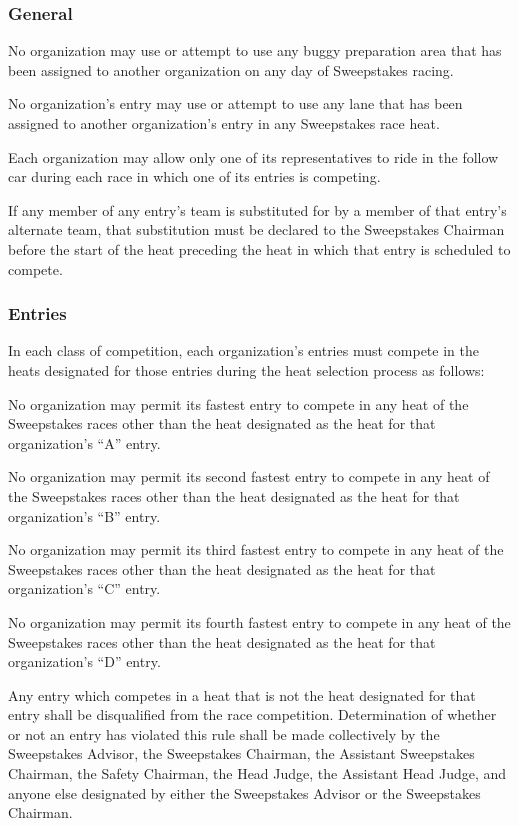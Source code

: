 \subsubsection{General}

No organization may use or attempt to use any buggy preparation area that has been assigned to another organization on any day of Sweepstakes racing.

No organization's entry may use or attempt to use any lane that has been assigned to another organization's entry in any Sweepstakes race heat.

Each organization may allow only one of its representatives to ride in the follow car during each race in which one of its entries is competing.

If any member of any entry's team is substituted for by a member of that entry's alternate team, that substitution must be declared to the Sweepstakes Chairman before the start of the heat preceding the heat in which that entry is scheduled to compete.

\subsubsection{Entries}

In each class of competition, each organization's entries must compete in the heats designated for those entries during the heat selection process as follows:

No organization may permit its fastest entry to compete in any heat of the Sweepstakes races other than the heat designated as the heat for that organization's ``A'' entry.

No organization may permit its second fastest entry to compete in any heat of the Sweepstakes races other than the heat designated as the heat for that organization's ``B'' entry.

No organization may permit its third fastest entry to compete in any heat of the Sweepstakes races other than the heat designated as the heat for that organization's ``C'' entry.

No organization may permit its fourth fastest entry to compete in any heat of the Sweepstakes races other than the heat designated as the heat for that organization's ``D'' entry.

Any entry which competes in a heat that is not the heat designated for that entry shall be disqualified from the race competition. Determination of whether or not an entry has violated this rule shall be made collectively by the Sweepstakes Advisor, the Sweepstakes Chairman, the Assistant Sweepstakes Chairman, the Safety Chairman, the Head Judge, the Assistant Head Judge, and anyone else designated by either the Sweepstakes Advisor or the Sweepstakes Chairman.


